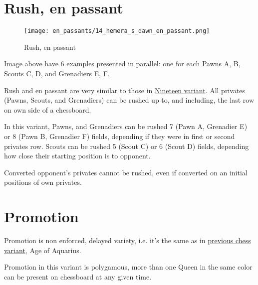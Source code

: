 \section*{Rush, en passant}
\label{sec:Hemera's Dawn/Rush, en passant}

\vspace*{-1.4\baselineskip}
\noindent
\begin{figure}[!h]
\texttt{[image: en\_passants/14\_hemera\_s\_dawn\_en\_passant.png]}
\vspace*{-1.3\baselineskip}
\caption{Rush, en passant}
\label{fig:14_hemera_s_dawn_en_passant}
\end{figure}

\vspace*{-0.5\baselineskip}
Image above have 6 examples presented in parallel: one for each Pawns A, B,
Scouts C, D, and Grenadiers E, F.

Rush and en passant are very similar to those in
\hyperref[fig:12_nineteen_en_passant]{Nineteen variant}.
All privates (Pawns, Scouts, and Grenadiers) can be rushed up to, and including,
the last row on own side of a chessboard.

In this variant, Pawns, and Grenadiers can be rushed 7 (Pawn A, Grenadier E) or 8
(Pawn B, Grenadier F) fields, depending if they were in first or second privates row.
Scouts can be rushed 5 (Scout C) or 6 (Scout D) fields, depending how close their
starting position is to opponent.

Converted opponent's privates cannot be rushed, even if converted on an initial
positions of own privates.


\section*{Promotion}
\label{sec:Hemera's Dawn/Promotion}

Promotion is non enforced, delayed variety, i.e. it's the same as in
\hyperref[sec:Age of Aquarius/Promotion]{previous chess variant}, Age of Aquarius.

Promotion in this variant is polygamous, more than one Queen in the same color
can be present on chessboard at any given time.

\clearpage %

